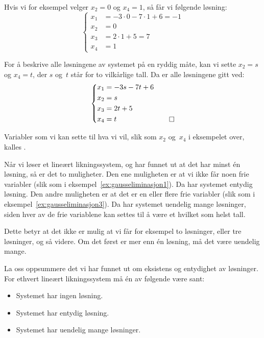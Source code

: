 \begin{ex}
Hvis vi for eksempel velger $x_2 = 0$ og $x_4 = 1$, så får vi
følgende løsning:
\[
\left\{
\begin{aligned}
x_1 &= -3 \cdot 0 - 7 \cdot 1 + 6 = -1 \\
x_2 &= 0 \\
x_3 &= 2 \cdot 1 + 5 = 7 \\
x_4 &= 1
\end{aligned}
\right.
\]

For å beskrive alle løsningene av systemet på en ryddig måte, kan vi
sette $x_2 = s$ og $x_4 = t$, der $s$ og~$t$ står for to vilkårlige
tall.  Da er alle løsningene gitt ved:
\[
\raisebox{23pt}{$
\left\{
\begin{aligned}
x_1 &= -3 s - 7 t + 6 \\
x_2 &= s \\
x_3 &= 2 t + 5 \\
x_4 &= t
\end{aligned}
\right.
$}
\qedhere
\]
\end{ex}

Variabler som vi kan sette til hva vi vil, slik som $x_2$ og~$x_4$ i
eksempelet over, kalles .

\medskip

Når vi løser et lineært likningssystem, og har funnet ut at det har
minst én løsning, så er det to muligheter.  Den ene muligheten er at
vi ikke får noen frie variabler (slik som i
eksempel~\ref{ex:gausseliminasjon1}).  Da har systemet entydig
løsning.  Den andre muligheten er at det er en eller flere frie
variabler (slik som i eksempel~\ref{ex:gausseliminasjon3}).  Da har
systemet uendelig mange løsninger, siden hver av de frie variablene
kan settes til å være et hvilket som helst tall.

Dette betyr at det ikke er mulig at vi får for eksempel to løsninger,
eller tre løsninger, og så videre.  Om det først er mer enn én
løsning, må det være uendelig mange.

\medskip

La oss oppsummere det vi har funnet ut om eksistens og entydighet av
løsninger.  For ethvert lineært likningssystem må én av følgende være
sant:
\begin{itemize}
\item Systemet har ingen løsning.
\item Systemet har entydig løsning.
\item Systemet har uendelig mange løsninger.
\end{itemize}


